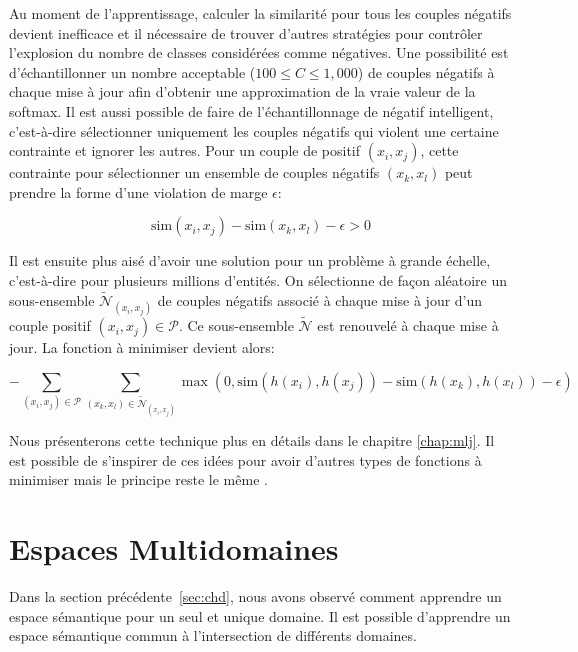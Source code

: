 Au moment de l'apprentissage, calculer la similarité pour tous les couples
négatifs devient inefficace et il nécessaire de trouver d'autres stratégies
pour contrôler l'explosion du nombre de classes considérées comme négatives.
Une possibilité est d'échantillonner un nombre acceptable ($100\leq C\leq 1,000$) de couples négatifs à chaque
mise à jour afin d'obtenir une approximation de la vraie valeur de la softmax.
Il est aussi possible de faire de l'échantillonnage de négatif intelligent, c'est-à-dire
sélectionner uniquement les couples négatifs qui violent une certaine
contrainte et ignorer les autres. Pour un couple de positif $(x_i, x_j)$, cette
contrainte pour sélectionner un ensemble de couples négatifs $(x_k, x_l)$ peut
prendre la forme d'une violation de marge $\epsilon$:

\begin{equation}
\textrm{sim}(x_i, x_j) - \textrm{sim}(x_k, x_l) - \epsilon > 0
\end{equation}

Il est ensuite plus aisé d'avoir une solution pour un problème à grande
échelle, c'est-à-dire pour plusieurs millions d'entités. On sélectionne de
façon aléatoire un sous-ensemble $\tilde{\mathcal{N}}_{(x_i, x_j)}$ de couples
négatifs associé à chaque mise à jour d'un couple positif $(x_i,
x_j)\in\mathcal{P}$.  Ce sous-ensemble $\tilde{\mathcal{N}}$ est renouvelé à
chaque mise à jour. La fonction à minimiser devient alors:  

\begin{equation}
-\sum_{(x_i, x_j)\in\mathcal{P}}\sum_{(x_k, x_l)\in\tilde{\mathcal{N}}_{(x_i, x_j)}} \max (0, \textrm{sim}(h(x_i), h(x_j)) - \textrm{sim}(h(x_k), h(x_l)) - \epsilon)
\label{eq:min-sim}
\end{equation}

Nous présenterons cette technique \citep{image-wsabie} plus en détails dans le chapitre
\ref{chap:mlj}. Il est possible de s'inspirer de ces idées pour avoir d'autres
types de fonctions à minimiser mais le principe reste le même \citep{rnn58}.

\section{Espaces Multidomaines}

Dans la section précédente~\ref{sec:chd}, nous avons observé comment apprendre un espace
sémantique pour un seul et unique domaine. Il est possible d'apprendre un espace
sémantique commun à l'intersection de différents domaines.  

